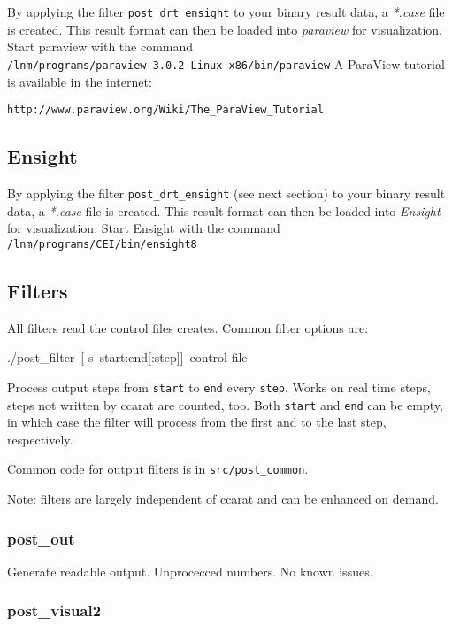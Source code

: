 By applying the filter \texttt{post\_drt\_ensight}
to your binary \baci{} result data, a \emph{*.case} file is created.
This result format can then be loaded into \emph{paraview} for visualization.
Start paraview with the command\\
\texttt{/lnm/programs/paraview-3.0.2-Linux-x86/bin/paraview}
A ParaView tutorial is available in the internet:
\begin{verbatim}
http://www.paraview.org/Wiki/The_ParaView_Tutorial
\end{verbatim}

\subsection{Ensight}

By applying the filter \texttt{post\_drt\_ensight} (see next section)
to your binary \baci{} result data, a \emph{*.case} file is created.
This result format can then be loaded into \emph{Ensight} for visualization.
Start Ensight with the command
\texttt{/lnm/programs/CEI/bin/ensight8}\\


\subsection{Filters}

All filters read the control files \ccarat{} creates. Common filter
options are:

\begin{lyxcode}
./post\_filter~{[}-s~start:end{[}:step]]~control-file
\end{lyxcode}
Process output steps from \texttt{start} to \texttt{end} every \texttt{step}.
Works on real time steps, steps not written by ccarat are counted,
too. Both \texttt{start} and \texttt{end} can be empty, in which case
the filter will process from the first and to the last step, respectively.

Common code for output filters is in \texttt{src/post\_common}.

Note: filters are largely independent of ccarat and can be enhanced
on demand.


\subsubsection{post\_out}

Generate readable output. Unprocecced numbers. No known issues.


\subsubsection{post\_visual2}

